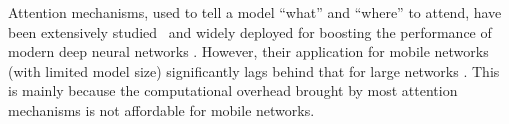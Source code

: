 \documentclass[final]{cvpr}
\begin{document}



Attention mechanisms, used to tell a model ``what'' and ``where'' to attend, have been extensively studied~\cite{xu2015show,mnih2014recurrent} and widely deployed for boosting the performance of modern deep neural networks
\cite{hu2018squeeze,woo2018cbam,cao2019gcnet,liu2020improving,fu2019dual,hou2020strip}.
%
%
However, their application for mobile networks (with limited model size) significantly lags behind that for large networks \cite{simonyan2014very,He2016,xie2017aggregated}.
%
This is mainly because 
the computational overhead brought by most attention mechanisms is not affordable for mobile networks.

%
\end{document}
